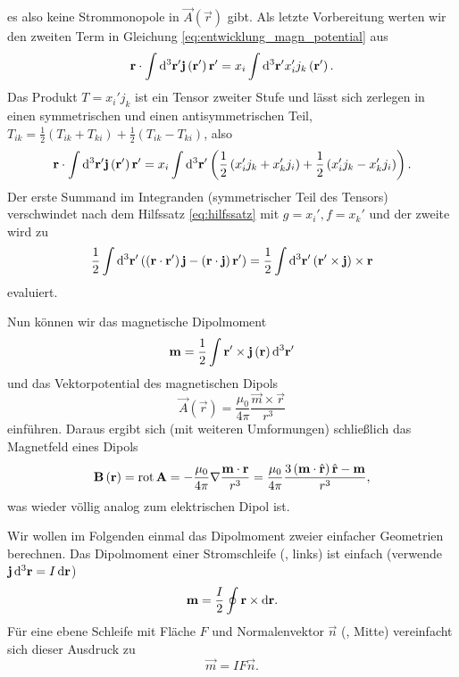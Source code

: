 es also keine Strommonopole in $\vec {A}\left(\vec {r}\right)$ gibt. Als letzte Vorbereitung werten wir den zweiten Term in Gleichung \eqref{eq:entwicklung_magn_potential} aus
\begin{equation*}
	\mathbf{r}\cdot \int \mathop{}\!\mathrm{d} ^{3}\mathbf{r}'\mathbf{j}\left(\mathbf{r}'\right)\mathbf{r}'=x_{i}\int \mathop{}\!\mathrm{d} ^{3}\mathbf{r}'x_{i}'j_{k}\left(\mathbf{r}'\right).
\end{equation*}
Das Produkt $T=x_{i}'j_{k}$ ist ein Tensor zweiter Stufe und lässt sich zerlegen in einen symmetrischen und einen antisymmetrischen Teil, $T_{ik}=\frac{1}{2}\left(T_{ik}+T_{ki}\right)+\frac{1}{2}\left(T_{ik}-T_{ki}\right)$, also
\begin{equation*}
	\mathbf{r}\cdot \int \mathop{}\!\mathrm{d} ^{3}\mathbf{r}'\mathbf{j}\left(\mathbf{r}'\right)\mathbf{r}'=x_{i}\int \mathop{}\!\mathrm{d} ^{3}\mathbf{r}'\left(\frac{1}{2}\left(x_{i}'j_{k}+x_{k}'j_{i}\right)+\frac{1}{2}\left(x_{i}'j_{k}-x_{k}'j_{i}\right)\right).
\end{equation*}
Der erste Summand im Integranden (symmetrischer Teil des Tensors) verschwindet nach dem Hilfssatz \eqref{eq:hilfssatz} mit $g=x_{i}',f=x_{k}'$ und der zweite wird zu
\begin{equation*}
	\frac{1}{2}\int \mathop{}\!\mathrm{d} ^{3}\mathbf{r}'\left(\left(\mathbf{r}\cdot \mathbf{r}'\right)\mathbf{j}-\left(\mathbf{r}\cdot \mathbf{j}\right)\mathbf{r}'\right)=\frac{1}{2}\int \mathop{}\!\mathrm{d} ^{3}\mathbf{r}'\left(\mathbf{r}'\times \mathbf{j}\right)\times \mathbf{r}
\end{equation*}
evaluiert.

Nun können wir das magnetische Dipolmoment
\begin{equation*}
	\mathbf{m}=\frac{1}{2}\int \mathbf{r}'\times \mathbf{j}\left(\mathbf{r}\right)\mathop{}\!\mathrm{d} ^{3}\mathbf{r}'
\end{equation*}
und das Vektorpotential des magnetischen Dipols
\begin{equation*}
	\vec {A}\left(\vec {r}\right)=\frac{\mu _{0}}{4\pi }\frac{\vec {m}\times \vec {r}}{r^{3}}
\end{equation*}
einführen. Daraus ergibt sich (mit weiteren Umformungen) schließlich das Magnetfeld eines Dipols
\begin{equation*}
	\mathbf{B}\left(\mathbf{r}\right)=\operatorname{rot} \mathbf{A}=-\frac{\mu _{0}}{4\pi }\nabla \frac{\mathbf{m}\cdot \mathbf{r}}{r^{3}}=\frac{\mu _{0}}{4\pi }\frac{3\left(\mathbf{m}\cdot \hat{\mathbf{r}}\right)\hat{\mathbf{r}}-\mathbf{m}}{r^{3}},
\end{equation*}
was wieder völlig analog zum elektrischen Dipol ist.

Wir wollen im Folgenden einmal das Dipolmoment zweier einfacher Geometrien berechnen. Das Dipolmoment einer Stromschleife (, links) ist einfach (verwende $\mathbf{j}\mathop{}\!\mathrm{d} ^{3}\mathbf{r}=I\mathop{}\!\mathrm{d} \mathbf{r}$)
\begin{equation*}
	\mathbf{m}=\frac{I}{2}\oint \mathbf{r}\times \mathop{}\!\mathrm{d} \mathbf{r}.
\end{equation*}
Für eine ebene Schleife mit Fläche $F$ und Normalenvektor $\vec {n}$ (, Mitte) vereinfacht sich dieser Ausdruck zu
\begin{equation*}
	\vec {m}=IF\vec {n}.
\end{equation*}


